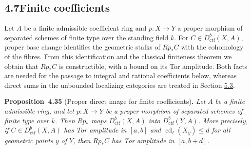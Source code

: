 \documentclass[11pt]{article}
\newenvironment{bpstatement}[2]{\par\addvspace{0.6\baselineskip}\noindent\textbf{#1}#2\textbf{.}\enspace\ignorespaces}
  {\par\addvspace{0.4\baselineskip}}
\newenvironment{bpstatementit}[2]{\begin{bpstatement}{#1}{#2}\itshape\ignorespaces}{\end{bpstatement}}
\begin{document}
\subsection*{\texorpdfstring{4.7\quad Finite coefficients}{4.7 Finite coefficients}}
\label{bp388}%
\label{bp389}%
Let \(A\) be a finite admissible coefficient ring and \(p:X\to Y\) a proper morphism of separated schemes of finite type over the standing field \(k\). For \(C\in D^b_{\mathrm{ctf}}(X,A)\), proper base change identifies the geometric stalks of \(Rp_*C\) with the cohomology of the fibres. From this identification and the classical finiteness theorem we obtain that \(Rp_*C\) is constructible, with a bound on its Tor amplitude. Both facts are needed for the passage to integral and rational coefficients below, whereas direct sums in the unbounded localizing categories are treated in Section \hyperref[bp449]{5.3}.

\label{bp390}%
\begin{bpstatementit}{Proposition~4.35}{ (Proper direct image for finite coefficients)}
Let \(A\) be a finite admissible ring, and let \(p:X\to Y\) be a proper morphism of separated schemes of finite type over \(k\). Then \(Rp_*\) maps \(D^b_{\mathrm{ctf}}(X,A)\) into \(D^b_{\mathrm{ctf}}(Y,A)\). More precisely, if \(C\in D^b_{\mathrm{ctf}}(X,A)\) has Tor amplitude in \([a,b]\) and \(\operatorname{cd}_\ell(X_{\bar y})\leq d\) for all geometric points \(\bar y\) of \(Y\), then \(Rp_*C\) has Tor amplitude in \([a,b+d]\).
\end{bpstatementit}
\end{document}
